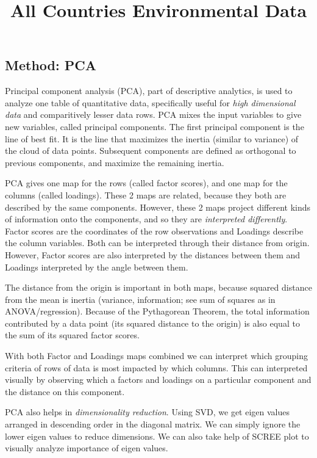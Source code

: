 \documentclass[]{article}
\title{All Countries Environmental Data}
\author{}
\date{}
\begin{document}
\maketitle

\hypertarget{method-pca}{%
\subsection{Method: PCA}\label{method-pca}}

Principal component analysis (PCA), part of descriptive analytics, is
used to analyze one table of quantitative data, specifically useful for
\emph{high dimensional data} and comparitively lesser data rows. PCA
mixes the input variables to give new variables, called principal
components. The first principal component is the line of best fit. It is
the line that maximizes the inertia (similar to variance) of the cloud
of data points. Subsequent components are defined as orthogonal to
previous components, and maximize the remaining inertia.

PCA gives one map for the rows (called factor scores), and one map for
the columns (called loadings). These 2 maps are related, because they
both are described by the same components. However, these 2 maps project
different kinds of information onto the components, and so they are
\emph{interpreted differently}. Factor scores are the coordinates of the
row observations and Loadings describe the column variables. Both can be
interpreted through their distance from origin. However, Factor scores
are also interpreted by the distances between them and Loadings
interpreted by the angle between them.

The distance from the origin is important in both maps, because squared
distance from the mean is inertia (variance, information; see sum of
squares as in ANOVA/regression). Because of the Pythagorean Theorem, the
total information contributed by a data point (its squared distance to
the origin) is also equal to the sum of its squared factor scores.

With both Factor and Loadings maps combined we can interpret which
grouping criteria of rows of data is most impacted by which columns.
This can interpreted visually by observing which a factors and loadings
on a particular component and the distance on this component.

PCA also helps in \emph{dimensionality reduction}. Using SVD, we get
eigen values arranged in descending order in the diagonal matrix. We can
simply ignore the lower eigen values to reduce dimensions. We can also
take help of SCREE plot to visually analyze importance of eigen values.
\end{document}
